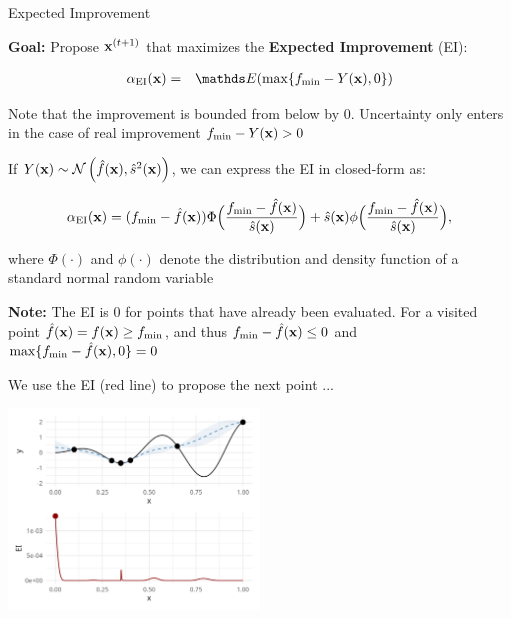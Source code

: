 \documentclass[11pt,compress,t,notes=noshow, xcolor=table]{beamer}
\begin{document}
\begin{vbframe}{Expected Improvement}

\textbf{Goal:} Propose $\mathbf{x}^{(t+1)}$ that maximizes the \textbf{Expected Improvement} (EI): 

\vspace*{-0.5cm}

\begin{eqnarray*}
  \alpha_{\text{EI}}(\xv) &=& \E(\max\{f_{\min} - Y(\xv), 0\}) \\
\end{eqnarray*} 

\vspace*{-0.5cm}

Note that the improvement is bounded from below by $0$. Uncertainty only enters in the case of real improvement $f_{\min} - Y(\mathbf{x}) > 0$

\framebreak

If $Y(\mathbf{x}) \sim \mathcal{N}\left(\hat{f}(\mathbf{x}), \hat{s}^2(\mathbf{x})\right)$, we can express the EI in closed-form as: 

$$
\alpha_{\text{EI}}(\mathbf{x}) = (f_{\min}-\hat{f}(\mathbf{x})) \Phi \Big(\frac{f_{\min} - \hat{f}(\mathbf{x})}{\hat{s}(\mathbf{x})}\Big) + \hat{s}(\mathbf{x}) \phi\Big(\frac{f_{\min}-\hat{f}(\mathbf{x})}{\hat{s}(\mathbf{x})}\Big), 
$$

where $\Phi(\cdot)$ and $\phi(\cdot)$ denote the distribution and density function of a standard normal random variable

\vfill

\begin{footnotesize}

\textbf{Note:} The EI is $0$ for points that have already been evaluated. For a visited point $\hat{f}(\mathbf{x}) = f(\mathbf{x}) \ge f_{\min}$, and thus $f_{\min} - \hat{f}(\mathbf{x}) \le 0$ and $\max\{f_{\min} - \hat{f}(\mathbf{x}), 0\} = 0$

\end{footnotesize}

\framebreak

We use the EI (red line) to propose the next point ...

\begin{center}
  \includegraphics[width = 0.5\textwidth]{figure_man/bayesian_loop_4.png}
\end{center}


\end{vbframe}
\end{document}
